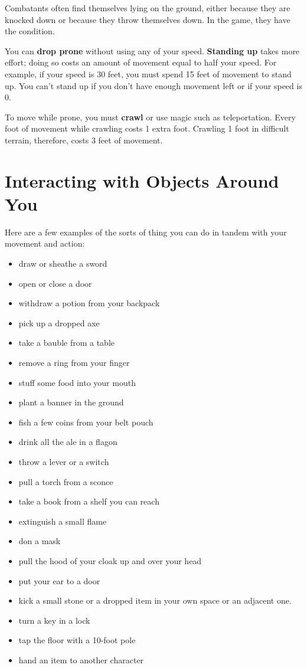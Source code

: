Combatants often find themselves lying on the ground, either because they are knocked down or because they throw themselves down. In the game, they have the  condition.

You can \textbf{drop prone} without using any of your speed. \textbf{Standing up} takes more effort; doing so costs an amount of movement equal to half your speed. For example, if your speed is 30 feet, you must spend 15 feet of movement to stand up. You can't stand up if you don't have enough movement left or if your speed is 0.

To move while prone, you must \textbf{crawl} or use magic such as teleportation. Every foot of movement while crawling costs 1 extra foot. Crawling 1 foot in difficult terrain, therefore, costs 3 feet of movement.

\section{Interacting with Objects Around You}

Here are a few examples of the sorts of thing you can do in tandem with your movement and action:

\begin{itemize}
\item draw or sheathe a sword
\item open or close a door
\item withdraw a potion from your backpack
\item pick up a dropped axe
\item take a bauble from a table
\item remove a ring from your finger
\item stuff some food into your mouth
\item plant a banner in the ground
\item fish a few coins from your belt pouch
\item drink all the ale in a flagon
\item throw a lever or a switch
\item pull a torch from a sconce
\item take a book from a shelf you can reach
\item extinguish a small flame
\item don a mask
\item pull the hood of your cloak up and over your head
\item put your ear to a door
\item kick a small stone or a dropped item in your own space or an adjacent one.
\item turn a key in a lock
\item tap the floor with a 10-foot pole
\item hand an item to another character
\end{itemize}

